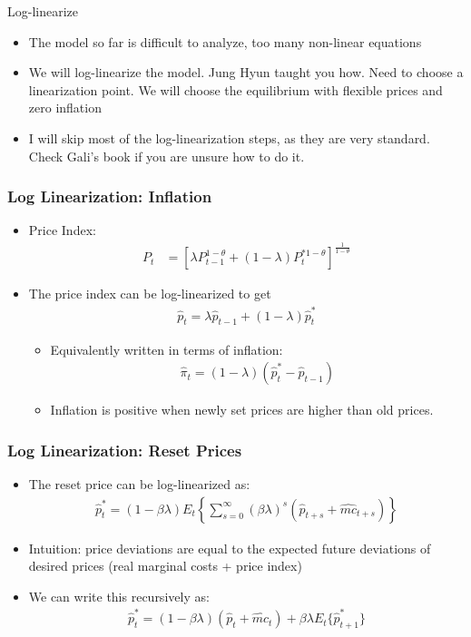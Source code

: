 \documentclass[11pt,aspectratio=169,xcolor={dvipsnames},hyperref={pdftex,pdfpagemode=UseNone,hidelinks,pdfdisplaydoctitle=true},usepdftitle=false]{beamer}
\begin{document}
\begin{frame}{Log-linearize}
\begin{itemize}
\item The model so far is difficult to analyze, too many non-linear equations
\pause
\item We will log-linearize the model. Jung Hyun taught you how. Need to choose a linearization point. We will choose the equilibrium with flexible prices and zero inflation
\pause
\item I will skip most of the log-linearization steps, as they are very standard. Check Gali's book if you are unsure how to do it.
\end{itemize}
\end{frame}



\begin{frame}
\frametitle{Log Linearization: Inflation
}
\begin{itemize}
	\item Price Index:
	\begin{align*}
		P_t&=\left[\lambda P_{t-1}^{1-\theta} + (1-\lambda) P_{t}^{*1-\theta}\right]^{\frac{1}{1-\theta}} 
	\end{align*}
	\pause
	\item The price index can be log-linearized to get
	\begin{align*}
		\hat{p}_t=\lambda \hat{p}_{t-1}+(1-\lambda)\hat{p}_t^*
	\end{align*}
	\pause
	\begin{itemize}
		\item Equivalently written in terms of inflation:
		\begin{align*}
		\hat{\pi}_t=(1-\lambda)(\hat{p}_t^*-\hat{p}_{t-1})
	\end{align*}
	\item Inflation is positive when newly set prices are higher than old prices.
	\end{itemize}
\end{itemize}
\end{frame}


\begin{frame}
\frametitle{Log Linearization: Reset Prices
}
\begin{itemize}
	\item The reset price can be log-linearized as:
	\begin{align*}
		\hat{p}_t^*=(1-\beta\lambda)E_t\left\{\sum_{s=0}^{\infty}(\beta\lambda)^s\left(\hat{p}_{t+s}+\hat{mc}_{t+s}\right)\right\} 
	\end{align*}
	\item Intuition: price deviations are equal to the expected future deviations of desired prices (real marginal costs + price index)
	\pause
	\item We can write this recursively as:
	\begin{align*}
		\hat{p}_t^*=(1-\beta\lambda)(\hat{p}_{t}+\hat{mc}_{t})+\beta\lambda E_t\{\hat{p}_{t+1}^*\}
	\end{align*}
\end{itemize}
\end{frame}
\end{document}
